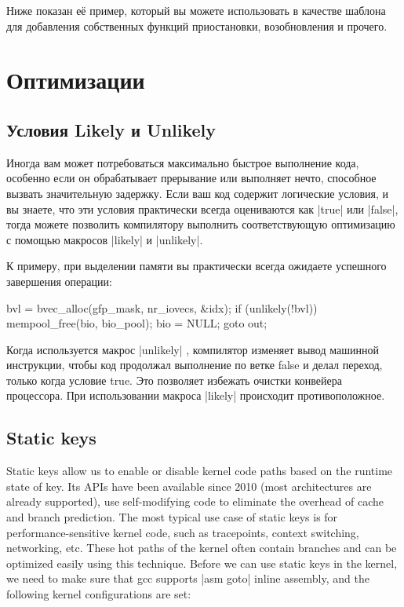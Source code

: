 \documentclass[10pt, oneside]{book}
\begin{document}
Ниже показан её пример, который вы можете использовать в качестве шаблона для добавления собственных функций приостановки, возобновления и прочего.


\section{Оптимизации}
\label{sec:optimization}
\subsection{Условия Likely и Unlikely}
\label{sec:likely_unlikely}
Иногда вам может потребоваться максимально быстрое выполнение кода, особенно если он обрабатывает прерывание или выполняет нечто, способное вызвать значительную задержку. Если ваш код содержит логические условия, и вы знаете, что эти условия практически всегда оцениваются как \cpp|true| или \cpp|false|, тогда можете позволить компилятору выполнить соответствующую оптимизацию с помощью макросов \cpp|likely| и \cpp|unlikely|.

К примеру, при выделении памяти вы практически всегда ожидаете успешного завершения операции:

\begin{code}
bvl = bvec_alloc(gfp_mask, nr_iovecs, &idx);
if (unlikely(!bvl)) {
    mempool_free(bio, bio_pool);
    bio = NULL;
    goto out;
}
\end{code}

Когда используется макрос \cpp|unlikely| , компилятор изменяет вывод машинной инструкции,
чтобы код продолжал выполнение по ветке false и делал переход, только когда условие true.
Это позволяет избежать очистки конвейера процессора. При использовании
макроса \cpp|likely| происходит противоположное.

\subsection{Static keys}
\label{sec:static_keys}
Static keys allow us to enable or disable kernel code paths based on the runtime state of key. Its APIs have been available since 2010 (most architectures are already supported), use self-modifying code to eliminate the overhead of cache and branch prediction.
The most typical use case of static keys is for performance-sensitive kernel code, such as tracepoints, context switching, networking, etc. These hot paths of the kernel often contain branches and can be optimized easily using this technique.
Before we can use static keys in the kernel, we need to make sure that gcc supports \cpp|asm goto| inline assembly, and the following kernel configurations are set:
\end{document}
